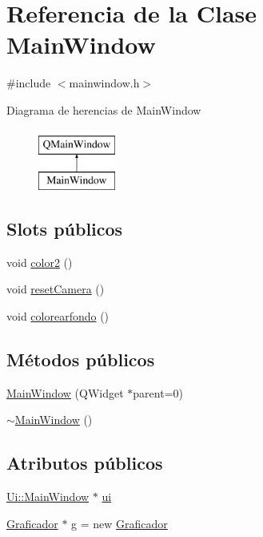 \hypertarget{class_main_window}{}\section{Referencia de la Clase Main\+Window}
\label{class_main_window}


{\ttfamily \#include $<$mainwindow.\+h$>$}

Diagrama de herencias de Main\+Window\begin{figure}[H]
\begin{center}
\leavevmode
\includegraphics[height=2.000000cm]{class_main_window}
\end{center}
\end{figure}
\subsection*{Slots públicos}
\begin{DoxyCompactItemize}
\item 
void \hyperlink{class_main_window_a2c95455ef4718d2cae34b21dd6a2b0cc}{color2} ()
\item 
void \hyperlink{class_main_window_acdfade55a70d7cba0ba0dbea3d77d183}{reset\+Camera} ()
\item 
void \hyperlink{class_main_window_a07339477c41a83cdec45f3da5eae1f6f}{colorearfondo} ()
\end{DoxyCompactItemize}
\subsection*{Métodos públicos}
\begin{DoxyCompactItemize}
\item 
\hyperlink{class_main_window_a8b244be8b7b7db1b08de2a2acb9409db}{Main\+Window} (Q\+Widget $\ast$parent=0)
\item 
\hyperlink{class_main_window_ae98d00a93bc118200eeef9f9bba1dba7}{$\sim$\+Main\+Window} ()
\end{DoxyCompactItemize}
\subsection*{Atributos públicos}
\begin{DoxyCompactItemize}
\item 
\hyperlink{class_ui_1_1_main_window}{Ui\+::\+Main\+Window} $\ast$ \hyperlink{class_main_window_a35466a70ed47252a0191168126a352a5}{ui}
\item 
\hyperlink{class_graficador}{Graficador} $\ast$ \hyperlink{class_main_window_ac5e0f9167fb0ab43e2c23cfcc04af6c1}{g} = new \hyperlink{class_graficador}{Graficador}
\end{DoxyCompactItemize}


